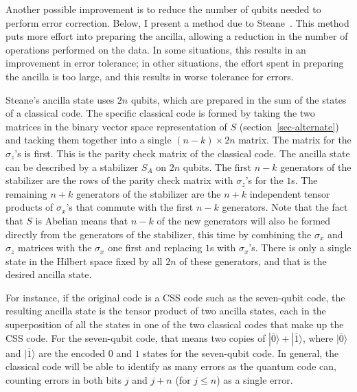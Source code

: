\documentclass{report}
\newcommand{\ket}[1]{|{#1}\rangle}
\newcommand{\X}{\sigma_x}
\newcommand{\Z}{\sigma_z}
\begin{document}
Another possible improvement is to reduce the number of qubits needed 
to perform error correction.  Below, I present a method due to 
Steane~\cite{steane-correction}.  This method puts more effort into 
preparing the ancilla, allowing a reduction in the number of operations 
performed on the data.  In some situations, this results in an improvement 
in error tolerance; in other situations, the effort spent in preparing the 
ancilla is too large, and this results in worse tolerance for errors.

Steane's ancilla state uses $2n$ qubits, which are prepared in the sum of 
the states of a classical code.  The specific classical code is formed by 
taking the two matrices in the binary vector space representation of $S$ 
(section~\ref{sec-alternate}) and tacking them together into a single $(n-k) 
\times 2n$ matrix.  The matrix for the $\Z$'s is first.  This is the parity 
check matrix of the classical code.  The ancilla state can be described by a 
stabilizer $S_A$ on $2n$ qubits.  The first $n-k$ generators of the stabilizer 
are the rows of the parity check matrix with $\Z$'s for the $1$s.  The remaining
$n+k$ generators of the stabilizer are the $n+k$ independent tensor 
products of $\X$'s that commute with the first $n-k$ generators.  Note that 
the fact that $S$ is Abelian means that $n-k$ of the new generators will 
also be formed directly from the generators of the stabilizer, this time by 
combining the $\X$ and $\Z$ matrices with the $\X$ one first and 
replacing $1$s with $\X$'s.  There is only a single state in the Hilbert space 
fixed by all $2n$ of these generators, and that is the desired ancilla
state.

For instance, if the original code is a CSS code such as the seven-qubit code, 
the resulting ancilla state is the tensor product of two ancilla states, each 
in the superposition of all the states in one of the two classical codes that 
make up the CSS code.  For the seven-qubit code, that means two copies of 
$\ket{\overline{0}} + \ket{\overline{1}}$, where $\ket{\overline{0}}$ and 
$\ket{\overline{1}}$ are the encoded $0$ and $1$ states for the seven-qubit 
code.  In general, the classical code will be able to identify as many errors 
as the quantum code can, counting errors in both bits $j$ and $j+n$ (for $j 
\leq n$) as a single error.
\end{document}
